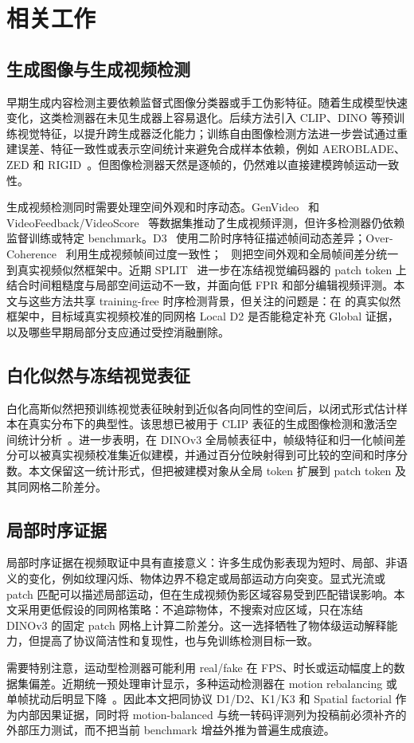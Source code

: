 \section{相关工作}
\label{sec:related_work}

\subsection{生成图像与生成视频检测}
早期生成内容检测主要依赖监督式图像分类器或手工伪影特征。随着生成模型快速变化，这类检测器在未见生成器上容易退化。后续方法引入 CLIP、DINO 等预训练视觉特征，以提升跨生成器泛化能力；训练自由图像检测方法进一步尝试通过重建误差、特征一致性或表示空间统计来避免合成样本依赖，例如 AEROBLADE、ZED 和 RIGID~\cite{ricker2024aeroblade,cozzolino2024zed,he2024rigid}。但图像检测器天然是逐帧的，仍然难以直接建模跨帧运动一致性。

生成视频检测同时需要处理空间外观和时序动态。GenVideo~\cite{chen2024genvideo} 和 VideoFeedback/VideoScore~\cite{he2024videoscore} 等数据集推动了生成视频评测，但许多检测器仍依赖监督训练或特定 benchmark。D3~\cite{zheng2025d3} 使用二阶时序特征描述帧间动态差异；Over-Coherence~\cite{brokman2026overcoherence} 利用生成视频帧间过度一致性；\stall~\cite{benhayun2026stall} 则把空间外观和全局帧间差分统一到真实视频似然框架中。近期 SPLIT~\cite{hyun2026split} 进一步在冻结视觉编码器的 patch token 上结合时间粗糙度与局部空间运动不一致，并面向低 FPR 和部分编辑视频评测。本文与这些方法共享 training-free 时序检测背景，但关注的问题是：在 \stall 的真实似然框架中，目标域真实视频校准的同网格 Local D2 是否能稳定补充 Global 证据，以及哪些早期局部分支应通过受控消融删除。

\subsection{白化似然与冻结视觉表征}
白化高斯似然把预训练视觉表征映射到近似各向同性的空间后，以闭式形式估计样本在真实分布下的典型性。该思想已被用于 CLIP 表征的生成图像检测和激活空间统计分析~\cite{betser2025whitenedclip,betser2026conditional,rachmil2025whitening}。\stall 进一步表明，在 DINOv3 全局帧表征中，帧级特征和归一化帧间差分可以被真实视频校准集近似建模，并通过百分位映射得到可比较的空间和时序分数。本文保留这一统计形式，但把被建模对象从全局 token 扩展到 patch token 及其同网格二阶差分。

\subsection{局部时序证据}
局部时序证据在视频取证中具有直接意义：许多生成伪影表现为短时、局部、非语义的变化，例如纹理闪烁、物体边界不稳定或局部运动方向突变。显式光流或 patch 匹配可以描述局部运动，但在生成视频伪影区域容易受到匹配错误影响。本文采用更低假设的同网格策略：不追踪物体，不搜索对应区域，只在冻结 DINOv3 的固定 patch 网格上计算二阶差分。这一选择牺牲了物体级运动解释能力，但提高了协议简洁性和复现性，也与免训练检测目标一致。

需要特别注意，运动型检测器可能利用 real/fake 在 FPS、时长或运动幅度上的数据集偏差。近期统一预处理审计显示，多种运动检测器在 motion rebalancing 或单帧扰动后明显下降~\cite{michels2026biases}。因此本文把同协议 D1/D2、K1/K3 和 Spatial factorial 作为内部因果证据，同时将 motion-balanced 与统一转码评测列为投稿前必须补齐的外部压力测试，而不把当前 benchmark 增益外推为普遍生成痕迹。

